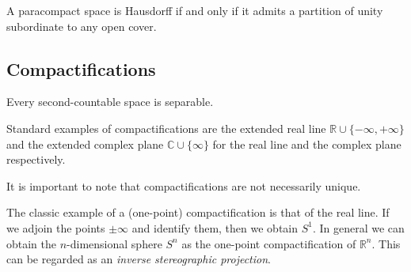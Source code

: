     \begin{property}\label{topology:paracompact_partition_unity}
        A paracompact space is Hausdorff if and only if it admits a partition of unity subordinate to any open cover.
    \end{property}


\subsection{Compactifications}

    \begin{property}
        Every second-countable space is separable.
    \end{property}


    \begin{example}
        Standard examples of compactifications are the extended real line $\mathbb{R} \cup \{-\infty, +\infty\}$ and the extended complex plane $\mathbb{C}\cup\{\infty\}$ for the real line and the complex plane respectively.
    \end{example}
    \begin{remark*}
        It is important to note that compactifications are not necessarily unique.
    \end{remark*}

    \begin{example}
        The classic example of a (one-point) compactification is that of the real line. If we adjoin the points $\pm\infty$ and identify them, then we obtain $S^1$. In general we can obtain the $n$-dimensional sphere $S^n$ as the one-point compactification of $\mathbb{R}^n$. This can be regarded as an \textit{inverse stereographic projection}.
    \end{example}

